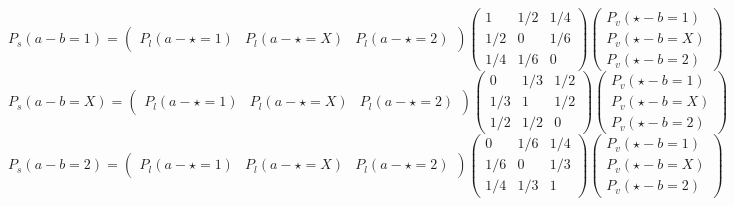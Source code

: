 {\footnotesize $$P_{s}(a-b=1)=
\left(\begin{array}{ccc}
P_{l}(a - \star=1) & P_{l}(a - \star=X) & P_{l}(a - \star=2)
\end{array} \right)
\left(\begin{array}{ccc}
1 & 1/2 & 1/4\\
1/2 & 0 & 1/6\\
1/4 & 1/6 & 0
\end{array} \right)
\left(\begin{array}{c}
P_{v}(\star - b=1)\\
P_{v}(\star - b=X)\\
P_{v}(\star - b=2)
\end{array} \right)
$$
$$P_{s}(a-b=X)=
\left(\begin{array}{ccc}
P_{l}(a - \star=1) & P_{l}(a - \star=X) & P_{l}(a - \star=2)
\end{array} \right)
\left(\begin{array}{ccc}
0 & 1/3 & 1/2\\
1/3 & 1 & 1/2\\
1/2 & 1/2 & 0
\end{array} \right)
\left(\begin{array}{c}
P_{v}(\star - b=1)\\
P_{v}(\star - b=X)\\
P_{v}(\star - b=2)
\end{array} \right)
$$
$$P_{s}(a-b=2)=
\left(\begin{array}{ccc}
P_{l}(a - \star=1) & P_{l}(a - \star=X) & P_{l}(a - \star=2)
\end{array} \right)
\left(\begin{array}{ccc}
0 & 1/6 & 1/4\\
1/6 & 0 & 1/3\\
1/4 & 1/3 & 1
\end{array} \right)
\left(\begin{array}{c}
P_{v}(\star - b=1)\\
P_{v}(\star - b=X)\\
P_{v}(\star - b=2)
\end{array} \right)
$$}

